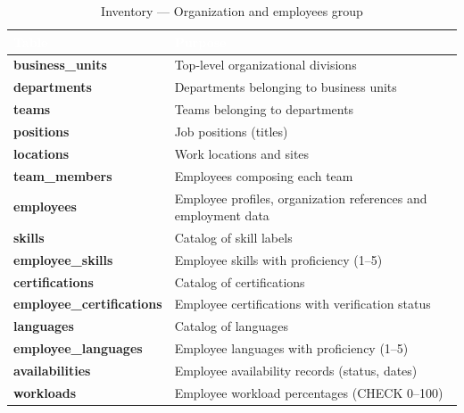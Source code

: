 \documentclass{bts-report}
\begin{document}
\begin{table}[H]
  \centering
  \caption{Inventory --- Organization and employees group}
  \label{tab:inv-orgemp}
  \begin{tabularx}{\textwidth}{|>{\bfseries}p{4.4cm}|X|}
    \hline
    \rowcolor{tableheader}
    \textcolor{white}{\textbf{Table}} & \textcolor{white}{\textbf{Purpose}} \\
    \hline
    business\_units & Top-level organizational divisions \\ \hline
    departments & Departments belonging to business units \\ \hline
    teams & Teams belonging to departments \\ \hline
    positions & Job positions (titles) \\ \hline
    locations & Work locations and sites \\ \hline
    team\_members & Employees composing each team \\ \hline
    employees & Employee profiles, organization references and employment data \\ \hline
    skills & Catalog of skill labels \\ \hline
    employee\_skills & Employee skills with proficiency (1--5) \\ \hline
    certifications & Catalog of certifications \\ \hline
    employee\_certifications & Employee certifications with verification status \\ \hline
    languages & Catalog of languages \\ \hline
    employee\_languages & Employee languages with proficiency (1--5) \\ \hline
    availabilities & Employee availability records (status, dates) \\ \hline
    workloads & Employee workload percentages (CHECK 0--100) \\ \hline
  \end{tabularx}
\end{table}
\end{document}
